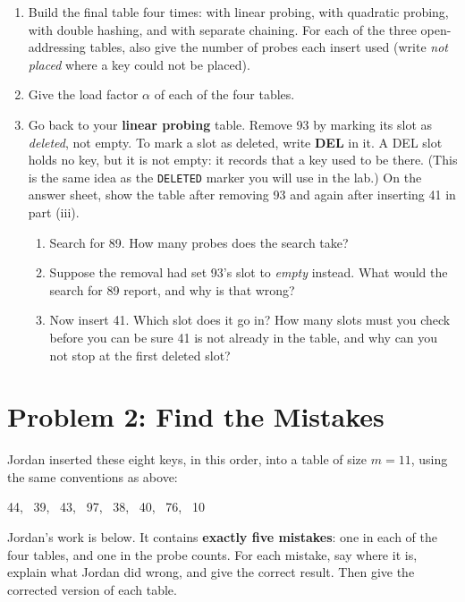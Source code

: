 \documentclass[11pt]{article}
\begin{document}
\begin{enumerate}[label=(\alph*), leftmargin=1.8em]
  \item Build the final table four times: with linear probing, with quadratic probing, with
    double hashing, and with separate chaining. For each of the three open-addressing tables,
    also give the number of probes each insert used (write \emph{not placed} where a key could
    not be placed).
  \item Give the load factor $\alpha$ of each of the four tables.
  \item Go back to your \textbf{linear probing} table. Remove 93 by marking its slot as
    \emph{deleted}, not empty. To mark a slot as deleted, write \textbf{DEL} in it. A DEL slot
    holds no key, but it is not empty: it records that a key used to be there. (This is the same
    idea as the \texttt{DELETED} marker you will use in the lab.) On the answer sheet, show the
    table after removing 93 and again after inserting 41 in part (iii).
    \begin{enumerate}[label=(\roman*), leftmargin=1.6em]
      \item Search for 89. How many probes does the search take?
      \item Suppose the removal had set 93's slot to \emph{empty} instead. What would the
        search for 89 report, and why is that wrong?
      \item Now insert 41. Which slot does it go in? How many slots must you check before you
        can be sure 41 is not already in the table, and why can you not stop at the first
        deleted slot?
    \end{enumerate}
\end{enumerate}

\section{Problem 2: Find the Mistakes}

Jordan inserted these eight keys, in this order, into a table of size $m = 11$, using the same
conventions as above:

\begin{center}
44, \ 39, \ 43, \ 97, \ 38, \ 40, \ 76, \ 10
\end{center}

Jordan's work is below. It contains \textbf{exactly five mistakes}: one in each of the four
tables, and one in the probe counts. For each mistake, say where it is, explain what Jordan did
wrong, and give the correct result. Then give the corrected version of each table.
\end{document}
